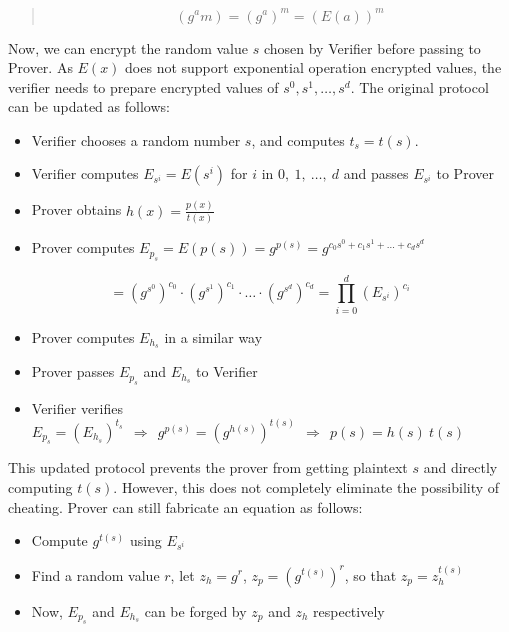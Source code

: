 \documentclass[
]{report}
\begin{document}
\begin{quote}
\[\left( g^{a}m \right) = \left( g^{a} \right)^{m} = \left( E(a) \right)^{m}\]
\end{quote}

Now, we can encrypt the random value \(s\) chosen by Verifier before
passing to Prover. As \(E(x)\) does not support exponential operation
encrypted values, the verifier needs to prepare encrypted values of
\(s^{0},s^{1},\ldots,s^{d}\). The original protocol can be updated as
follows:

\begin{itemize}
\item
  Verifier chooses a random number \(s\), and computes \(t_{s} = t(s)\).
\item
  Verifier computes \(E_{s^{i}} = E\left( s^{i} \right)\) for \(i\) in
  \(0,\ 1,\ \ldots,\ d\) and passes \(E_{s^{i}}\) to Prover
\item
  Prover obtains \(h(x) = \frac{p(x)}{t(x)}\)
\item
  Prover computes
  \(E_{p_{s}} = E\left( p(s) \right) = g^{p(s)} = g^{c_{0}s^{0} + c_{1}s^{1} + \ldots + c_{d}s^{d}}\)
\end{itemize}

\[= \left( g^{s^{0}} \right)^{c_{0}} \cdot \left( g^{s^{1}} \right)^{c_{1}} \cdot \ldots \cdot \left( g^{s^{d}} \right)^{c_{d}} = \prod_{i = 0}^{d}\left( E_{s^{i}} \right)^{c_{i}}\]

\begin{itemize}
\item
  Prover computes \(E_{h_{s}}\) in a similar way
\item
  Prover passes \(E_{p_{s}}\) and \(E_{h_{s}}\) to Verifier
\item
  Verifier verifies
  \(E_{p_{s}} = \left( E_{h_{s}} \right)^{t_{s}}\mathbf{\ \  \Rightarrow \ \ }g^{p(s)} = \left( g^{h(s)} \right)^{t(s)}\mathbf{\ \  \Rightarrow \ \ }p(s) = h(s)\ t(s)\)
\end{itemize}

This updated protocol prevents the prover from getting plaintext \(s\)
and directly computing \(t(s)\). However, this does not completely
eliminate the possibility of cheating. Prover can still fabricate an
equation as follows:

\begin{itemize}
\item
  Compute \(g^{t(s)}\) using \(E_{s^{i}}\)
\item
  Find a random value \(r\), let \(z_{h} = g^{r}\),
  \(z_{p} = \left( g^{t(s)} \right)^{r}\), so that
  \(z_{p} = z_{h}^{t(s)}\)
\item
  Now, \(E_{p_{s}}\) and \(E_{h_{s}}\) can be forged by \(z_{p}\) and
  \(z_{h}\) respectively
\end{itemize}
\end{document}
